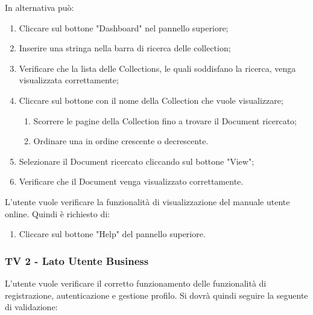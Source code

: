 In alternativa può:
\begin{enumerate}
\item Cliccare sul bottone "Dashboard" nel pannello superiore;
\item Inserire una stringa nella barra di ricerca delle collection;
\item  Verificare che la lista delle Collections, le quali soddisfano la ricerca, venga visualizzata correttamente;
\item Cliccare sul bottone con il nome della Collection che vuole visualizzare;
\begin{enumerate}
\item Scorrere le pagine della Collection fino a trovare il Document ricercato;
\item Ordinare una  in ordine crescente o decrescente.
\end{enumerate}
\item Selezionare il Document ricercato cliccando sul bottone "View";
\item Verificare che il Document venga visualizzato correttamente.
\end{enumerate}
L'utente vuole verificare la funzionalità di visualizzazione del manuale utente online.
Quindi è richiesto di:
\begin{enumerate}
\item Cliccare sul bottone "Help" del pannello superiore.
\end{enumerate}

\subsubsection{TV 2 - Lato Utente Business}
L'utente vuole verificare il corretto funzionamento delle funzionalità di registrazione, autenticazione e gestione profilo.
Si dovrà quindi seguire la seguente  di validazione:

